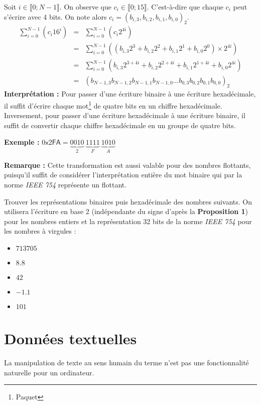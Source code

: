 \documentclass[../../main.tex]{subfiles}
\begin{document}
Soit $i\in{\llbracket 0; N-1\rrbracket}$. On observe que $c_{i}\in{\llbracket 0; 15\rrbracket}$. C'est-à-dire que chaque $c_{i}$ peut s'écrire avec 4 bits. On note alors $c_{i} = (b_{i, 3}, b_{i, 2}, b_{i, 1}, b_{i, 0})_{2}$.
$$
\begin{array}{lcl}
\displaystyle\sum_{i = 0}^{N-1}\left(c_{i}16^{i}\right) & = & \displaystyle\sum_{i = 0}^{N-1}\left(c_{i}2^{4i}\right) \\
 & = & \displaystyle\sum_{i = 0}^{N-1}\left((b_{i, 3}2^{3} + b_{i, 2}2^{2} + b_{i, 1}2^{1} + b_{i, 0}2^{0})\times2^{4i}\right) \\
 & = & \displaystyle\sum_{i = 0}^{N-1}\left(b_{i, 3}2^{3 + 4i} + b_{i, 2}2^{2 + 4i} + b_{i, 1}2^{1 + 4i} + b_{i, 0}2^{4i}\right) \\
 & = & (b_{N-1, 3}b_{N-1, 2}b_{N-1, 1}b_{N-1, 0}\dots b_{0, 3}b_{0, 2}b_{0, 1}b_{0, 0})_{2}
\end{array}
$$
\textbf{Interprétation :} Pour passer d'une écriture binaire à une écriture hexadécimale, il suffit d'écrire chaque mot\footnote{Paquet} de quatre bits en un chiffre hexadécimale. Inversement, pour passer d'une écriture hexadécimale à une écriture binaire, il suffit de convertir chaque chiffre hexadécimale en un groupe de quatre bits.

\textbf{Exemple :}  $0\textsf{x}2\textsf{FA} = \underbrace{0010}_{2}\ \underbrace{1111}_{F}\ \underbrace{1010}_{A}$

\textbf{Remarque :} Cette transformation est aussi valable pour des nombres flottants, puisqu'il suffit de considérer l'interprétation entière du mot binaire qui par la norme \textit{IEEE 754} représente un flottant.

\newline
Trouver les représentations binaires puis hexadécimale des nombres suivants. On utilisera l'écriture en base 2 (indépendante du signe d'après la \textbf{Proposition 1}) pour les nombres entiers et la représentation 32 bits de la norme \textit{IEEE 754} pour les nombres à virgules :
\begin{itemize}
     \item $713705$
     \item $8.8$
     \item $42$
     \item $-1.1$
     \item $101$
\end{itemize}
\section{Données textuelles} \label{sec:donn_es_textuelles}
La manipulation de texte au sens humain du terme n'est pas une fonctionnalité naturelle pour un ordinateur.
 
\end{document}
